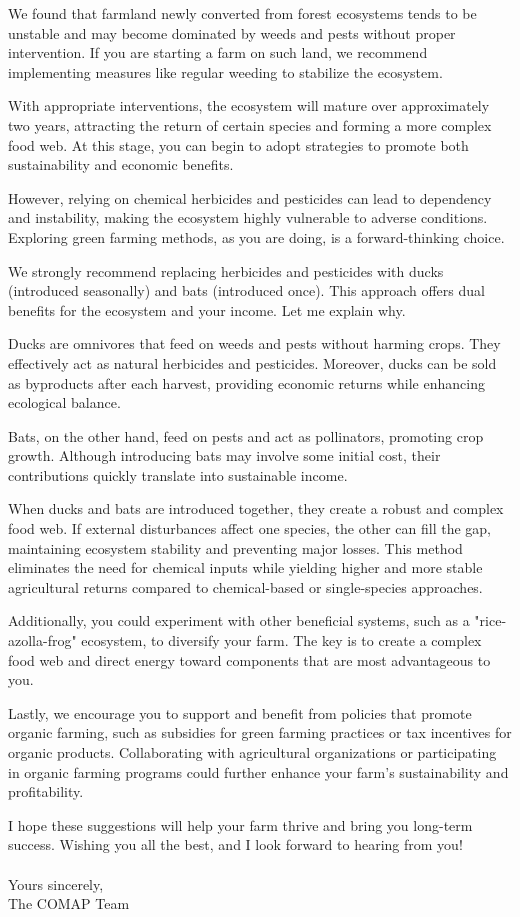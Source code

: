 \documentclass{HZNUMCM}
\begin{document}
We found that farmland newly converted from forest ecosystems tends to be unstable and may become dominated by weeds and pests without proper intervention. 
If you are starting a farm on such land, we recommend implementing measures like regular weeding to stabilize the ecosystem.  

With appropriate interventions, the ecosystem will mature over approximately two years, 
attracting the return of certain species and forming a more complex food web. 
At this stage, you can begin to adopt strategies to promote both sustainability and economic benefits.

However, relying on chemical herbicides and pesticides can lead to dependency and instability, 
making the ecosystem highly vulnerable to adverse conditions. 
Exploring green farming methods, as you are doing, is a forward-thinking choice.  

We strongly recommend replacing herbicides and pesticides with ducks (introduced seasonally) and bats (introduced once). 
This approach offers dual benefits for the ecosystem and your income. Let me explain why.

Ducks are omnivores that feed on weeds and pests without harming crops. 
They effectively act as natural herbicides and pesticides. 
Moreover, ducks can be sold as byproducts after each harvest, providing economic returns while enhancing ecological balance.

Bats, on the other hand, feed on pests and act as pollinators, promoting crop growth. 
Although introducing bats may involve some initial cost, their contributions quickly translate into sustainable income.

When ducks and bats are introduced together, they create a robust and complex food web. 
If external disturbances affect one species, the other can fill the gap, maintaining ecosystem stability and preventing major losses. 
This method eliminates the need for chemical inputs while yielding higher and more stable agricultural returns compared to chemical-based or single-species approaches.

Additionally, you could experiment with other beneficial systems, 
such as a "rice-azolla-frog" ecosystem, to diversify your farm. 
The key is to create a complex food web and direct energy toward components that are most advantageous to you.

Lastly, we encourage you to support and benefit from policies that promote organic farming, 
such as subsidies for green farming practices or tax incentives for organic products. 
Collaborating with agricultural organizations or participating in organic farming programs could further enhance your farm's sustainability and profitability.

I hope these suggestions will help your farm thrive and bring you long-term success. Wishing you all the best, and I look forward to hearing from you!
\\
\\
Yours sincerely,\\  
The COMAP Team
\end{document}
